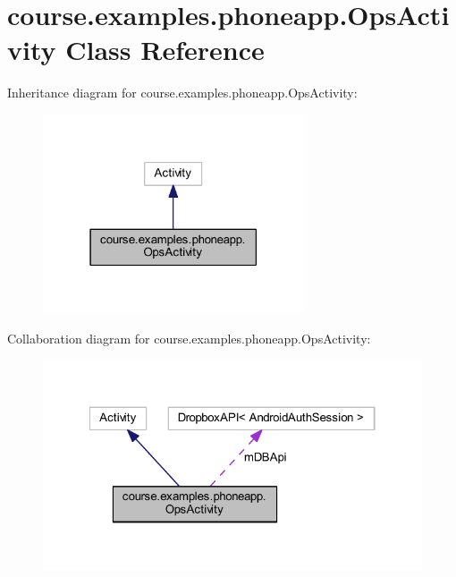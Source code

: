 \hypertarget{classcourse_1_1examples_1_1phoneapp_1_1_ops_activity}{}\section{course.\+examples.\+phoneapp.\+Ops\+Activity Class Reference}
\label{classcourse_1_1examples_1_1phoneapp_1_1_ops_activity}


Inheritance diagram for course.\+examples.\+phoneapp.\+Ops\+Activity\+:
\nopagebreak
\begin{figure}[H]
\begin{center}
\leavevmode
\includegraphics[width=219pt]{classcourse_1_1examples_1_1phoneapp_1_1_ops_activity__inherit__graph}
\end{center}
\end{figure}


Collaboration diagram for course.\+examples.\+phoneapp.\+Ops\+Activity\+:
\nopagebreak
\begin{figure}[H]
\begin{center}
\leavevmode
\includegraphics[width=322pt]{classcourse_1_1examples_1_1phoneapp_1_1_ops_activity__coll__graph}
\end{center}
\end{figure}
